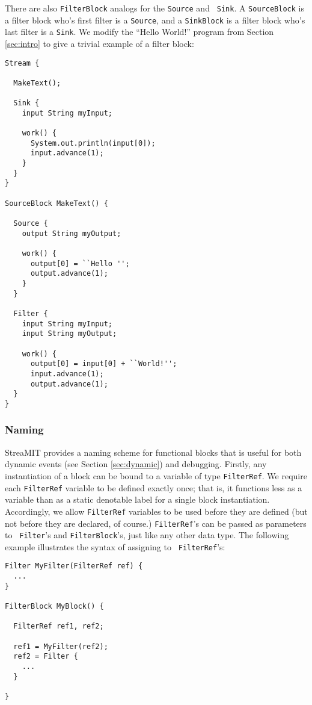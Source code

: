 \documentclass[draft]{article}
\begin{document}
There are also {\tt FilterBlock} analogs for the {\tt Source} and {\tt
Sink}.  A {\tt SourceBlock} is a filter block who's first filter is a
{\tt Source}, and a {\tt SinkBlock} is a filter block who's last
filter is a {\tt Sink}.  We modify the ``Hello World!''  program from
Section {\ref{sec:intro}} to give a trivial example of a filter block:

\begin{verbatim}
Stream {

  MakeText();

  Sink {
    input String myInput;
    
    work() {
      System.out.println(input[0]);
      input.advance(1);
    }
  }
}

SourceBlock MakeText() {

  Source {
    output String myOutput;

    work() {
      output[0] = ``Hello '';
      output.advance(1);
    }
  }

  Filter {
    input String myInput;
    input String myOutput;

    work() {
      output[0] = input[0] + ``World!'';
      input.advance(1);
      output.advance(1);
  }
}

\end{verbatim}

\subsubsection{Naming}

StreaMIT provides a naming scheme for functional blocks that is useful
for both dynamic events (see Section {\ref{sec:dynamic}}) and
debugging.  Firstly, any instantiation of a block can be bound to a
variable of type {\tt FilterRef}.  We require each {\tt FilterRef}
variable to be defined exactly once; that is, it functions less as a
variable than as a static denotable label for a single block
instantiation.  Accordingly, we allow {\tt FilterRef} variables to be
used before they are defined (but not before they are declared, of
course.)  {\tt FilterRef}'s can be passed as parameters to {\tt
Filter}'s and {\tt FilterBlock}'s, just like any other data type.  The
following example illustrates the syntax of assigning to {\tt
FilterRef}'s:

\begin{verbatim}
Filter MyFilter(FilterRef ref) {
  ...
}

FilterBlock MyBlock() {

  FilterRef ref1, ref2;

  ref1 = MyFilter(ref2);
  ref2 = Filter {
    ...
  }

}
\end{verbatim}
\end{document}
